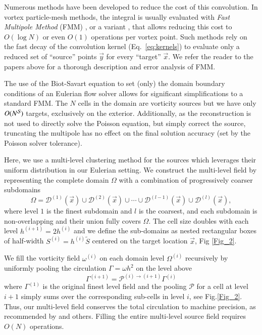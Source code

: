 \documentclass[final,1p,times]{elsarticle}
\begin{document}
Numerous methods have been developed to reduce the cost of this convolution. In vortex particle-mesh methods, the integral is usually evaluated with \emph{Fast Multipole Method} (FMM) \cite{Greencard1987ASimulations}, or a variant \cite{Ying2004ADimensions, Fong2009TheMethod}, that allows reducing this cost to $O(\log N)$ or even $O(1)$ operations per vortex point. Such methods  rely on the fast decay of the convolution kernel (Eq.~\ref{eq:kernels}) to evaluate only a reduced set of ``source'' points $\vec y$ for every ``target'' $\vec x$. We refer the reader to the papers above for a thorough description and error analysis of FMM.

The use of the Biot-Savart equation to set (only) the domain boundary conditions of an Eulerian flow solver allows for significant simplifications to a standard FMM. The $N$ cells in the domain are vorticity sources but we have only $O(N^{\cal S})$ targets, exclusively on the exterior. Additionally, as the reconstruction is not used to directly solve the Poisson equation, but simply correct the source, truncating the multipole has no effect on the final solution accuracy (set by the Poisson solver tolerance).

Here, we use a multi-level clustering method for the sources which leverages their uniform distribution in our Eulerian setting. We construct the multi-level field by representing the complete domain $\Omega$ with a combination of progressively coarser subdomains
\begin{equation}\label{eq:multilevel}
    \Omega = \mathcal{D}^{(1)}(\vec x) \cup \mathcal{D}^{(2)}(\vec x) \cup \cdots \cup \mathcal{D}^{(l-1)}(\vec x) \cup \mathcal{D}^{(l)}(\vec x),
\end{equation}
where level $1$ is the finest subdomain and $l$ is the coarsest, and each subdomain is non-overlapping and their union fully covers $\Omega$. The cell size doubles with each level $h^{(i+1)}=2h^{(i)}$ and we define the sub-domains as nested rectangular boxes of half-width $S^{(i)}=h^{(i)}\tilde S$ centered on the target location $\vec x$, Fig \ref{Fig_2}. 

We fill the vorticity field $\omega^{(i)}$ on each domain level $\Omega^{(i)}$ recursively by uniformly pooling the circulation $\Gamma=\omega h^2$ on the level above 
\begin{equation}
\Gamma^{(i+1)}=\mathcal{P}^{(i)\to(i+1)}\Gamma^{(i)}
\end{equation}
where $\Gamma^{(1)}$ is the original finest level field and the pooling $\mathcal{P}$ for a cell at level $i+1$ simply sums over the corresponding sub-cells in level $i$, see Fig.\ref{Fig_2}. Thus, our multi-level field conserves the total circulation to machine precision, as recommended by \cite{Colonius2008} and others. Filling the entire multi-level source field requires $O(N)$ operations.
\end{document}
